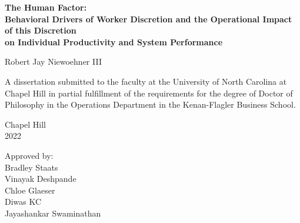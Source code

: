 \begin{titlepage}
\begin{center}


\vspace{2in}
\begin{singlespace}
\bf
The Human Factor:\\
Behavioral Drivers of Worker Discretion and the Operational Impact of this Discretion\\
on Individual Productivity and System Performance
\end{singlespace}


\vspace{61pt} %
\large Robert Jay Niewoehner III
\end{center}



\vspace{50pt}
\begin{singlespace}
\noindent \large
A dissertation submitted to the faculty at the University of North Carolina at Chapel Hill
in partial fulfillment of the requirements for the degree of Doctor of Philosophy in the 
Operations Department in the Kenan-Flagler Business School.
\end{singlespace}


\vspace{50pt}
\begin{center}
\begin{singlespace} \large
Chapel Hill\\
2022
\end{singlespace}
\end{center}


\vfill
\begin{flushright}
\begin{minipage}[t]{2in} \large
Approved by:\\
Bradley Staats \\
Vinayak Deshpande \\
Chloe Glaeser \\
Diwas KC \\
Jayashankar Swaminathan
\end{minipage}
\end{flushright}

\end{titlepage}
